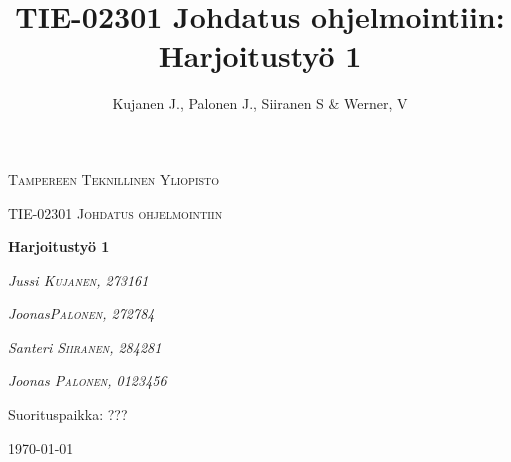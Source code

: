 \documentclass[12pt]{report} %
\title{TIE-02301 Johdatus ohjelmointiin: Harjoitustyö 1}
\author{Kujanen J., Palonen J., Siiranen S \& Werner, V}
\begin{document}

    \begin{titlepage}
        \centering
        {\scshape\LARGE Tampereen Teknillinen Yliopisto \par}
        \vspace{1cm}
        {\scshape\Large TIE-02301 Johdatus ohjelmointiin\par}
        \vspace{2.5cm}
        {\huge\bfseries Harjoitustyö 1 \par}
        \vspace{4cm}
        {\Large\itshape Jussi \textsc{Kujanen}, \textit{273161}\par}
        {\Large\itshape Joonas\textsc{Palonen}, \textit{272784}\par}
        {\Large\itshape Santeri \textsc{Siiranen}, \textit{284281}\par}
        {\Large\itshape Joonas \textsc{Palonen}, \textit{0123456}\par}
        
        \vfill
        Suorituspaikka: \textsc{???}
    
        \vfill
    
        {\large \today \par}
    \end{titlepage}

    
    \setcounter{page}{1}                    %
    


    {
        \hypersetup{linkcolor=black}
        \tableofcontents  %
    
    }
    


    
    
\end{document}
